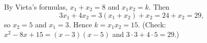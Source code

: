 By Vieta's formulas, $x_1+x_2=8$ and $x_1x_2=k$. Then
\[
3x_1+4x_2=3(x_1+x_2)+x_2=24+x_2=29,
\]
so $x_2=5$ and $x_1=3$. Hence $k=x_1x_2=\boxed{15}$. (Check: $x^2-8x+15=(x-3)(x-5)$ and $3\cdot3+4\cdot5=29$.)
